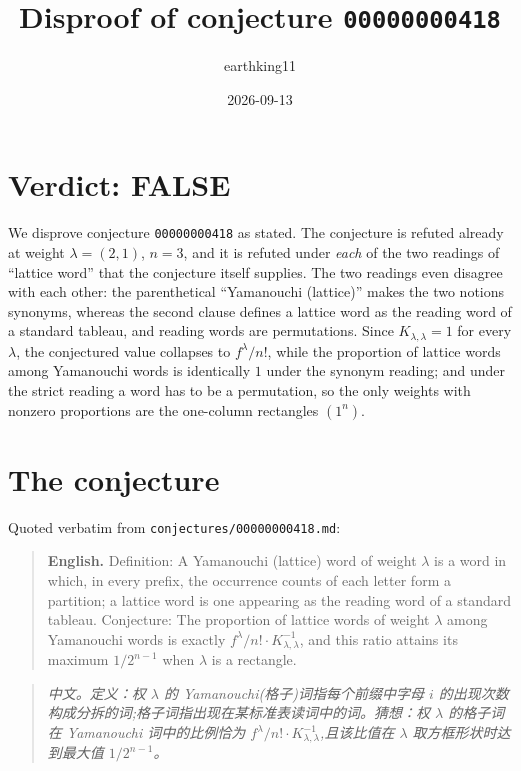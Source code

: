 \documentclass[11pt]{article}
\title{Disproof of conjecture \texttt{00000000418}}
\author{earthking11}
\date{2026-09-13}
\theoremstyle{definition}
\theoremstyle{remark}
\begin{document}
\maketitle

\section*{Verdict: FALSE}

We disprove conjecture \texttt{00000000418} as stated. The conjecture is refuted
already at weight $\lambda=(2,1)$, $n=3$, and it is refuted under \emph{each} of
the two readings of ``lattice word'' that the conjecture itself supplies. The
two readings even disagree with each other: the parenthetical
``Yamanouchi (lattice)'' makes the two notions synonyms, whereas the second
clause defines a lattice word as the reading word of a standard tableau, and
reading words are permutations. Since $K_{\lambda,\lambda}=1$ for every
$\lambda$, the conjectured value collapses to $f^\lambda/n!$, while the
proportion of lattice words among Yamanouchi words is identically $1$ under the
synonym reading; and under the strict reading a word has to be a permutation,
so the only weights with nonzero proportions are the one-column rectangles
$(1^n)$.

\section{The conjecture}

Quoted verbatim from \texttt{conjectures/00000000418.md}:

\begin{quote}
\textbf{English.} Definition: A Yamanouchi (lattice) word of weight $\lambda$
is a word in which, in every prefix, the occurrence counts of each letter form
a partition; a lattice word is one appearing as the reading word of a standard
tableau. Conjecture: The proportion of lattice words of weight $\lambda$ among
Yamanouchi words is exactly $f^\lambda/n! \cdot K^{-1}_{\lambda,\lambda}$, and
this ratio attains its maximum $1/2^{n-1}$ when $\lambda$ is a rectangle.
\end{quote}

\begin{quote}\itshape
中文。定义：权 $\lambda$ 的 Yamanouchi(格子)词指每个前缀中字母 $i$
的出现次数构成分拆的词;格子词指出现在某标准表读词中的词。猜想：权
$\lambda$ 的格子词在 Yamanouchi 词中的比例恰为 $f^\lambda/n!\cdot
K^{-1}_{\lambda,\lambda}$,且该比值在 $\lambda$ 取方框形状时达到最大值
$1/2^{n-1}$。
\end{quote}
\end{document}

